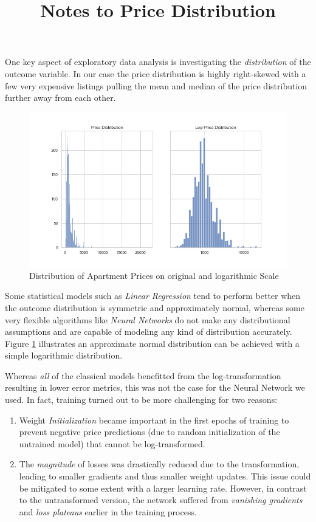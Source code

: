 \documentclass[12pt, letterpaper]{article}
\title{Notes to Price Distribution}
\author{}
\date{}
\begin{document}
\maketitle

One key aspect of exploratory data analysis is investigating the \emph{distribution} of the outcome variable.
In our case the price distribution is highly right-skewed with a few very expensive listings pulling the mean and median of the price distribution further away from each other.

\begin{figure}[ht]
    \centering
    \includegraphics[width=\textwidth]{price_distribution.png}
    \caption{Distribution of Apartment Prices on original and logarithmic Scale}
    \label{fig:price-distribution}
\end{figure}

Some statistical models such as \emph{Linear Regression} tend to perform better when the outcome distribution is symmetric and approximately normal, whereas some very flexible algorithms like \emph{Neural Networks} do not make any distributional assumptions and are capable of modeling any kind of distribution accurately.
Figure \ref{fig:price-distribution} illustrates an approximate normal distribution can be achieved with a simple logarithmic distribution.

Whereas \emph{all} of the classical models benefitted from the log-transformation resulting in lower error metrics, this was not the case for the Neural Network we used.
In fact, training turned out to be more challenging for two reasons:
\begin{enumerate}
    \item Weight \emph{Initialization} became important in the first epochs of training to prevent negative price predictions (due to random initialization of the untrained model) that cannot be log-transformed.
    \item The \emph{magnitude} of losses was drastically reduced due to the transformation, leading to smaller gradients and thus smaller weight updates.
          This issue could be mitigated to some extent with a larger learning rate.
          However, in contrast to the untransformed version, the network suffered from \emph{vanishing gradients} and \emph{loss plateaus} earlier in the training process.
\end{enumerate}


\newpage



\end{document}
